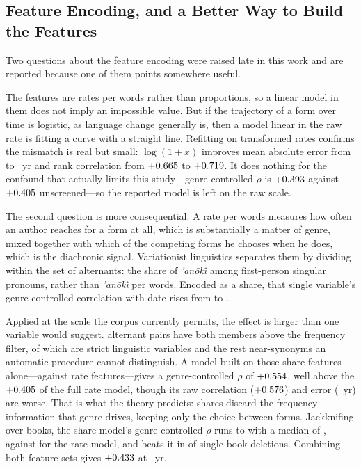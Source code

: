 \documentclass[10pt,letterpaper]{article}
\begin{document}
\subsection*{Feature Encoding, and a Better Way to Build the Features}

Two questions about the feature encoding were raised late in this work and are
reported because one of them points somewhere useful.

The features are rates per \HBtarget{} words rather than proportions, so a
linear model in them does not imply an impossible value.  But if the trajectory
of a form over time is logistic, as language change generally is, then a model
linear in the raw rate is fitting a curve with a straight line.  Refitting on
transformed rates confirms the mismatch is real but small: $\log(1+x)$ improves
mean absolute error from \FSrawMae{} to \FSlogMae~yr and rank correlation from
$+0.665$ to $+0.719$.  It does nothing for the confound that actually
limits this study---genre-controlled $\rho$ is $+0.393$ against
$+0.405$ unscreened---so the reported model is left on the raw scale.

The second question is more consequential.  A rate per \HBtarget{} words
measures how often an author reaches for a form at all, which is substantially a
matter of genre, mixed together with which of the competing forms he chooses
when he does, which is the diachronic signal.  Variationist linguistics
separates them by dividing within the set of alternants: the share of
\emph{'an\=ok\^\i}{} among first-person singular pronouns, rather than
\emph{'an\=ok\^\i}{} per \HBtarget{} words.  Encoded as a share, that single
variable's genre-controlled correlation with date rises from \FSanokiGenre{} to
\FSshareGenre.

Applied at the scale the corpus currently permits, the effect is larger than one
variable would suggest.  \VTpairs{} alternant pairs have both members above the
frequency filter, of which \VTstrict{} are strict linguistic variables and the
rest near-synonyms an automatic procedure cannot distinguish.  A model built on
those \VTshareFeat{} share features alone---against \HBfeat{} rate
features---gives a genre-controlled $\rho$ of $+0.554$, well above the
$+0.405$ of the full rate model, though its raw correlation
($+0.576$) and error (\VTshareMae~yr) are worse.  That is what the theory
predicts: shares discard the frequency information that genre drives, keeping
only the choice between forms.  Jackknifing over books, the share model's
genre-controlled $\rho$ runs \VTjkLo{} to \VTjkHi{} with a median of
\VTjkMed, against \VTjkRateMed{} for the rate model, and beats it in
\VTjkWin{} of \VTjkN{} single-book deletions.  Combining both feature sets gives
$+0.433$ at \VTbothMae~yr.
\end{document}
